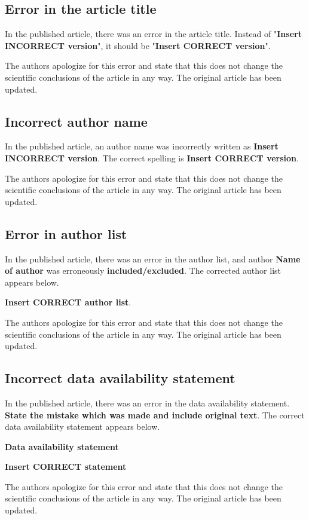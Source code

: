 \documentclass[utf8]{frontiers_correction}
\begin{document}
\vspace{5mm}
\subsection*{Error in the article title}
In the published article, there was an error in the article title. Instead of "\textbf{Insert INCORRECT version}", it should be "\textbf{Insert CORRECT version}".\par The authors apologize for this error and state that this does not change the scientific conclusions of the article in any way. The original article has been updated.


\vspace{5mm}
\subsection*{Incorrect author name}
In the published article, an author name was incorrectly written as \textbf{Insert INCORRECT version}. The correct spelling is \textbf{Insert CORRECT version}.\par The authors apologize for this error and state that this does not change the scientific conclusions of the article in any way. The original article has been updated.


\vspace{5mm}
\subsection*{Error in author list}
In the published article, there was an error in the author list, and author \textbf{Name of author} was erroneously \textbf{included/excluded}. The corrected author list appears below.\par
\textbf{Insert CORRECT author list}.\par
The authors apologize for this error and state that this does not change the scientific conclusions of the article in any way. The original article has been updated.

\vspace{5mm}
\subsection*{Incorrect data availability statement}
In the published article, there was an error in the data availability statement. \textbf{State the mistake which was made and include original text}. The correct data availability statement appears below.\par
\textbf{Data availability statement}\par
\textbf{Insert CORRECT statement}\par
The authors apologize for this error and state that this does not change the scientific conclusions of the article in any way. The original article has been updated.
\end{document}
